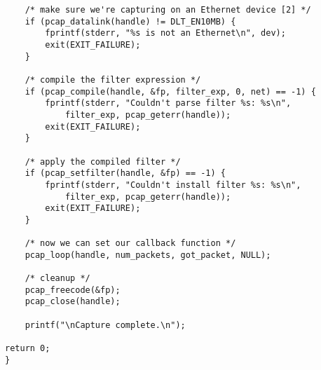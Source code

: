 \documentclass[a4paper,12pt]{article}
\begin{document}
\begin{verbatim}
	/* make sure we're capturing on an Ethernet device [2] */
	if (pcap_datalink(handle) != DLT_EN10MB) {
		fprintf(stderr, "%s is not an Ethernet\n", dev);
		exit(EXIT_FAILURE);
	}

	/* compile the filter expression */
	if (pcap_compile(handle, &fp, filter_exp, 0, net) == -1) {
		fprintf(stderr, "Couldn't parse filter %s: %s\n",
		    filter_exp, pcap_geterr(handle));
		exit(EXIT_FAILURE);
	}

	/* apply the compiled filter */
	if (pcap_setfilter(handle, &fp) == -1) {
		fprintf(stderr, "Couldn't install filter %s: %s\n",
		    filter_exp, pcap_geterr(handle));
		exit(EXIT_FAILURE);
	}

	/* now we can set our callback function */
	pcap_loop(handle, num_packets, got_packet, NULL);

	/* cleanup */
	pcap_freecode(&fp);
	pcap_close(handle);

	printf("\nCapture complete.\n");

return 0;
}
			\end{verbatim}
			\restoregeometry
\end{document}

